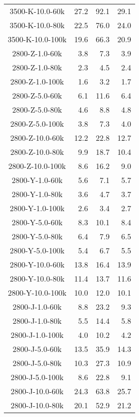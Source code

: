 \begin{longtable}{crrr}
    3500-K-10.0-60k  &   27.2 &   92.1 &   29.1 \\
    3500-K-10.0-80k  &   22.5 &   76.0 &   24.0 \\
    3500-K-10.0-100k &   19.6 &   66.3 &   20.9 \\
    2800-Z-1.0-60k   &    3.8 &    7.3 &    3.9 \\
    2800-Z-1.0-80k   &    2.3 &    4.5 &    2.4 \\
    2800-Z-1.0-100k  &    1.6 &    3.2 &    1.7 \\
    2800-Z-5.0-60k   &    6.1 &   11.6 &    6.4 \\
    2800-Z-5.0-80k   &    4.6 &    8.8 &    4.8 \\
    2800-Z-5.0-100k  &    3.8 &    7.3 &    4.0 \\
    2800-Z-10.0-60k  &   12.2 &   22.8 &   12.7 \\
    2800-Z-10.0-80k  &    9.9 &   18.7 &   10.4 \\
    2800-Z-10.0-100k &    8.6 &   16.2 &    9.0 \\
    2800-Y-1.0-60k   &    5.6 &    7.1 &    5.7 \\
    2800-Y-1.0-80k   &    3.6 &    4.7 &    3.7 \\
    2800-Y-1.0-100k  &    2.6 &    3.4 &    2.7 \\
    2800-Y-5.0-60k   &    8.3 &   10.1 &    8.4 \\
    2800-Y-5.0-80k   &    6.4 &    7.9 &    6.5 \\
    2800-Y-5.0-100k  &    5.4 &    6.7 &    5.5 \\
    2800-Y-10.0-60k  &   13.8 &   16.4 &   13.9 \\
    2800-Y-10.0-80k  &   11.4 &   13.7 &   11.6 \\
    2800-Y-10.0-100k &   10.0 &   12.0 &   10.1 \\
    2800-J-1.0-60k   &    8.8 &   23.2 &    9.3 \\
    2800-J-1.0-80k   &    5.5 &   14.4 &    5.8 \\
    2800-J-1.0-100k  &    4.0 &   10.2 &    4.2 \\
    2800-J-5.0-60k   &   13.5 &   35.9 &   14.3 \\
    2800-J-5.0-80k   &   10.3 &   27.3 &   10.9 \\
    2800-J-5.0-100k  &    8.6 &   22.8 &    9.1 \\
    2800-J-10.0-60k  &   24.3 &   63.8 &   25.7 \\
    2800-J-10.0-80k  &   20.1 &   52.9 &   21.2 \\

\end{longtable}
